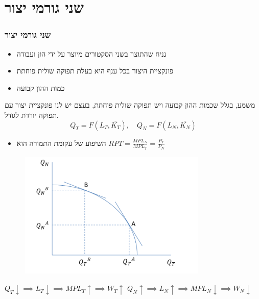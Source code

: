 \documentclass[usenames,dvipsnames]{beamer}
\begin{document}
\begin{RTL}
\begin{frame}
\end{frame}

\section{שני גורמי יצור}
\begin{frame}[allowframebreaks]
    \frametitle{שני גורמי יצור}
    \begin{itemize}
        \item נניח שהתוצר בשני הסקטורים מיוצר על ידי הון ועבודה
        \item פונקציית היצור בכל ענף היא בעלת תפוקה שולית פוחתת
        \item כמות ההון קבועה
    \end{itemize}
    משמע, בגלל שכמות ההון קבועה ויש תפוקה שולית פוחתת, בעצם יש לנו פונקציית יצור עם תפוקה יורדת לגודל.
    $$
    Q_T = F(L_T, \bar{K_T}), \quad Q_N = F(L_N, \bar{K_N})
    $$
    \begin{itemize}
    \item השיפוע של עקומת התמורה הוא $RPT = \frac{MPL_N}{MPL_T} = \frac{P_T}{P_N}$
    \end{itemize}

    \framebreak
    \begin{figure}[ht]
        \centering
        \includegraphics[width=0.8\textwidth]{TNT.png}
    \end{figure}
        \begin{center}
 $Q_T \downarrow \implies L_T \downarrow \implies MPL_T \uparrow \implies W_T \uparrow$
 $Q_N \uparrow \implies L_N \uparrow \implies MPL_N \downarrow \implies W_N \downarrow$
    \end{center}




    
\end{frame}


\end{RTL}
\end{document}
